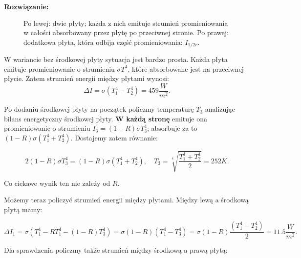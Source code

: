 \documentclass[11pt,a4paper]{article}
\begin{document}
\vskip 10pt
\textbf{Rozwiązanie:}\\

\begin{figure}\vspace{-0.1cm}
  \caption{Po lewej: dwie płyty; każda z nich emituje strumień promieniowania w całości absorbowany
    przez płytę po przeciwnej stronie.
    Po prawej: dodatkowa płyta, która odbija część promieniowania: $I_{1/2r}$.}
\end{figure}

W wariancie bez środkowej płyty sytuacja jest bardzo prosta. Każda płyta emituje promieniowanie
o strumieniu $\sigma T^4$, które absorbowane jest na przeciwnej płycie. Zatem strumień energii między płytami wynosi:
\begin{equation}
\Delta I = \sigma(T_1^4-T_2^4) = 459 \frac{W}{m^2}.
\end{equation}

Po dodaniu środkowej płyty na początek policzmy temperaturę $T_3$ analizując bilans energetyczny środkowej
płyty. \textbf{W każdą stronę} emituje ona promieniowanie o strumieniu $I_3 = (1-R)\sigma T_3^4$; absorbuje
za to $(1-R)\sigma (T_1^4 +T_2^4)$.
Dostajemy zatem równanie:

\begin{equation}
2(1-R) \sigma T_3^4 = (1-R) \sigma (T_1^4+T_2^4), \quad T_3 = \sqrt[4]{\frac{T_1^4+T_2^4}{2}}= 252 K.
\end{equation}

Co ciekawe wynik ten nie zależy od $R$.

Możemy teraz policzyć strumień energii między płytami. Między lewą a środkową płytą mamy:

\begin{equation}
  \Delta I_1 = \sigma (  T_1^4- R T_1^4 - (1-R)T_3^4) = \sigma (1-R) (T_1^4-T_3^4) =
  \sigma(1-R) \frac{(T_1^4-T_2^4)}{2} = 11.5 \frac{W}{m^2}.
\end{equation}

Dla sprawdzenia policzmy także strumień między środkową a prawą płytą:
\end{document}
